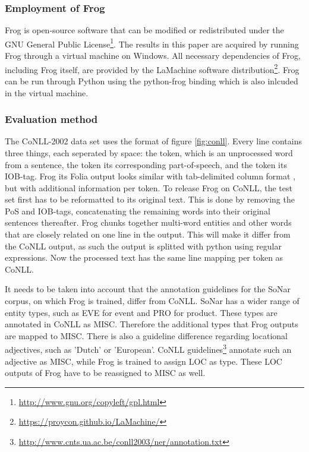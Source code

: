 \subsubsection{Employment of Frog}
Frog is open-source software that can be modified or redistributed under the GNU General Public License\footnote{\url{http://www.gnu.org/copyleft/gpl.html}}. The results in this paper are acquired by running Frog through a virtual machine on Windows. All necessary dependencies of Frog, including Frog itself, are provided by the LaMachine software distribution\footnote{\url{https://proycon.github.io/LaMachine/}}. Frog can be run through Python using the python-frog binding which is also inlcuded in the virtual machine.

\subsubsection{Evaluation method}
The CoNLL-2002 data set uses the format of figure \ref{fig:conll}. Every line contains three things, each seperated by space: the token, which is an unprocessed word from a sentence, the token its corresponding part-of-speech, and the token its IOB-tag. Frog its Folia output looks similar with tab-delimited column format , but with additional information per token. To release Frog on CoNLL, the test set first has to be reformatted to its original text. This is done by removing the PoS and IOB-tags, concatenating the remaining words into their original sentences thereafter.  Frog chunks together multi-word entities and other words that are closely related on one line in the output. This will make it differ from the CoNLL output, as such the output is splitted with python using regular expressions. Now the processed text has the same line mapping per token as CoNLL.

It needs to be taken into account that the annotation guidelines for the SoNar corpus, on which Frog is trained, differ from CoNLL. SoNar has a wider range of entity types, such as EVE for event and PRO for product. These types are annotated in CoNLL as MISC. Therefore the additional types that Frog outputs are mapped to MISC. There is also a guideline difference regarding locational adjectives, such as 'Dutch' or 'European'. CoNLL guidelines\footnote{\url{http://www.cnts.ua.ac.be/conll2003/ner/annotation.txt}} annotate such an adjective as MISC, while Frog is trained to assign LOC as type. These LOC outputs of Frog have to be reassigned to MISC as well.

